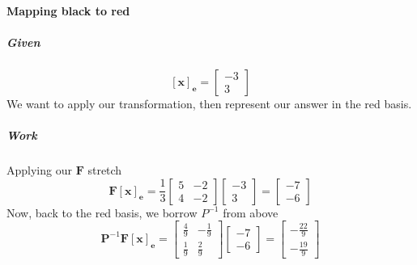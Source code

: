 \documentclass{article}
\begin{document}
            \paragraph{Mapping black to red}
                \subparagraph{Given}
                    \[
                        [\mathbf{x}]_{\mathbf{e}}
                        =
                        \begin{bmatrix}
                            -3\\3
                        \end{bmatrix}
                    \]
                    We want to apply our transformation, then represent our
                    answer in the red basis.
                \subparagraph{Work}
                    Applying our $\mathbf{F}$ stretch
                    \[
                        \mathbf{F}[\mathbf{x}]_{\mathbf{e}}=
                        \frac{1}{3}\begin{bmatrix}5 & -2 \\ 4 & -2\end{bmatrix}
                        \begin{bmatrix}
                            -3\\3
                        \end{bmatrix}
                        =
                        \begin{bmatrix}
                            -7\\-6
                        \end{bmatrix}
                    \]
                    Now, back to the red basis, we borrow $P^{-1}$ from above
                    \[
                        \mathbf{P}^{-1}\mathbf{F}[\mathbf{x}]_{\mathbf{e}}=
                        \begin{bmatrix}
                            \frac{4}{9} & -\frac{1}{9} \\
                            \frac{1}{9} & \frac{2}{9}
                        \end{bmatrix}
                        \begin{bmatrix}
                            -7\\-6
                        \end{bmatrix}
                        =
                        \begin{bmatrix}
                            -\frac{22}{9}\\-\frac{19}{9}
                        \end{bmatrix}
                    \]
\end{document}
